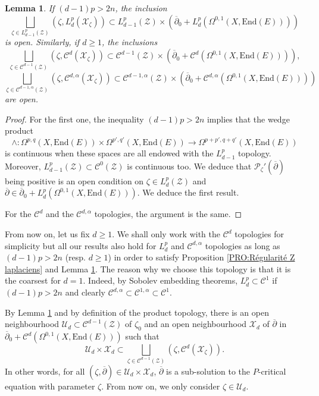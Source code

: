 \documentclass{article}
\newtheorem{lemma}[theorem]{Lemma}
\theoremstyle{remark}
\theoremstyle{definition}
\newcommand{\End}{\mathrm{End}}
\newcommand{\mC}{\mathcal{C}}
\newcommand{\mP}{\mathcal{P}}
\newcommand{\mX}{\mathcal{X}}
\newcommand{\mZ}{\mathcal{Z}}
\newcommand{\mU}{\mathcal{U}}
\newcommand{\dbar}{\overline{\partial}}
\renewcommand{\geq}{\geqslant}
\begin{document}
\begin{lemma}\label{LEM:X_zeta ouverts}
    If $(d - 1)p > 2n$, the inclusion
    $$
    \bigsqcup_{\zeta \in L_{d - 1}^p(\mZ)} (\zeta,L_d^p(\mX_\zeta)) \subset L_{d - 1}^p(\mZ) \times (\dbar_0 + L_d^p(\Omega^{0,1}(X,\End(E))))
    $$
    is open. Similarly, if $d \geq 1$, the inclusions
    $$
    \bigsqcup_{\zeta \in \mC^{d - 1}(\mZ)} (\zeta,\mC^d(\mX_\zeta)) \subset \mC^{d - 1}(\mZ) \times (\dbar_0 + \mC^d(\Omega^{0,1}(X,\End(E)))),
    $$
    $$
    \bigsqcup_{\zeta \in \mC^{d - 1,\alpha}(\mZ)} (\zeta,\mC^{d,\alpha}(\mX_\zeta)) \subset \mC^{d - 1,\alpha}(\mZ) \times (\dbar_0 + \mC^{d,\alpha}(\Omega^{0,1}(X,\End(E))))
    $$
    are open.
\end{lemma}
\begin{proof}
For the first one, the inequality $(d - 1)p > 2n$ implies that the wedge product
$$
\wedge : \Omega^{p,q}(X,\End(E)) \times \Omega^{p',q'}(X,\End(E)) \rightarrow \Omega^{p + p',q + q'}(X,\End(E))
$$
is continuous when these spaces are all endowed with the $L_{d - 1}^p$ topology. Moreover, $L_{d - 1}^p(\mZ) \subset \mC^0(\mZ)$ is continuous too. We deduce that $\mP_\zeta'(\dbar)$ being positive is an open condition on $\zeta \in L_d^p(\mZ)$ and $\dbar \in \dbar_0 + L_d^p(\Omega^{0,1}(X,\End(E)))$. We deduce the first result.

For the $\mC^d$ and the $\mC^{d,\alpha}$ topologies, the argument is the same.
\end{proof}

From now on, let us fix $d \geq 1$. We shall only work with the $\mC^d$ topologies for simplicity but all our results also hold for $L_d^p$ and $\mC^{d,\alpha}$ topologies as long as $(d - 1)p > 2n$ (resp. $d \geq 1$) in order to satisfy Proposition \ref{PRO:Régularité Z laplaciens} and Lemma \ref{LEM:X_zeta ouverts}. The reason why we choose this topology is that it is the coarsest for $d = 1$. Indeed, by Sobolev embedding theorems, $L_d^p \subset \mC^1$ if $(d - 1)p > 2n$ and clearly $\mC^{d,\alpha} \subset \mC^{1,\alpha} \subset \mC^1$.

By Lemma \ref{LEM:X_zeta ouverts} and by definition of the product topology, there is an open neighbourhood $\mU_d \subset \mC^{d - 1}(\mZ)$ of $\zeta_0$ and an open neighbourhood $\mX_d$ of $\dbar$ in $\dbar_0 + \mC^d(\Omega^{0,1}(X,\End(E)))$ such that
$$
\mU_d \times \mX_d \subset \bigsqcup_{\zeta \in \mC^{d - 1}(\mZ)} (\zeta,\mC^d(\mX_\zeta)).
$$
In other words, for all $(\zeta,\dbar) \in \mU_d \times \mX_d$, $\dbar$ is a sub-solution to the $P$-critical equation with parameter $\zeta$. From now on, we only consider $\zeta \in \mU_d$.
\end{document}
